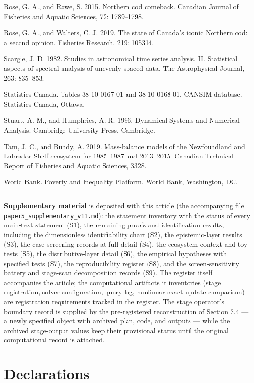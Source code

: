 \documentclass[11pt]{article}
\begin{document}
Rose, G. A., and Rowe, S. 2015. Northern cod comeback. Canadian Journal
of Fisheries and Aquatic Sciences, 72: 1789--1798.

Rose, G. A., and Walters, C. J. 2019. The state of Canada's iconic
Northern cod: a second opinion. Fisheries Research, 219: 105314.

Scargle, J. D. 1982. Studies in astronomical time series analysis. II.
Statistical aspects of spectral analysis of unevenly spaced data. The
Astrophysical Journal, 263: 835--853.

Statistics Canada. Tables 38-10-0167-01 and 38-10-0168-01, CANSIM
database. Statistics Canada, Ottawa.

Stuart, A. M., and Humphries, A. R. 1996. Dynamical Systems and
Numerical Analysis. Cambridge University Press, Cambridge.

Tam, J. C., and Bundy, A. 2019. Mass-balance models of the Newfoundland
and Labrador Shelf ecosystem for 1985--1987 and 2013--2015. Canadian
Technical Report of Fisheries and Aquatic Sciences, 3328.

World Bank. Poverty and Inequality Platform. World Bank, Washington, DC.

\begin{center}\rule{0.5\linewidth}{0.5pt}\end{center}

\textbf{Supplementary material} is deposited with this article (the
accompanying file \texttt{paper5\_supplementary\_v11.md}): the statement
inventory with the status of every main-text statement (S1), the
remaining proofs and identification results, including the dimensionless
identifiability chart (S2), the epistemic-layer results (S3), the
case-screening records at full detail (S4), the ecosystem context and
toy tests (S5), the distributive-layer detail (S6), the empirical
hypotheses with specified tests (S7), the reproducibility register
(S8), and the screen-sensitivity battery and stage-scan decomposition
records (S9). The register itself accompanies the article; the computational
artifacts it inventories (stage registration, solver configuration,
query log, nonlinear exact-update comparison) are registration
requirements tracked in the register. The stage operator's boundary
record is supplied by the pre-registered reconstruction of
Section 3.4 --- a newly specified object with archived plan, code, and
outputs --- while the archived stage-output values keep their
provisional status until the original computational record is attached.

\section*{Declarations}
\end{document}
